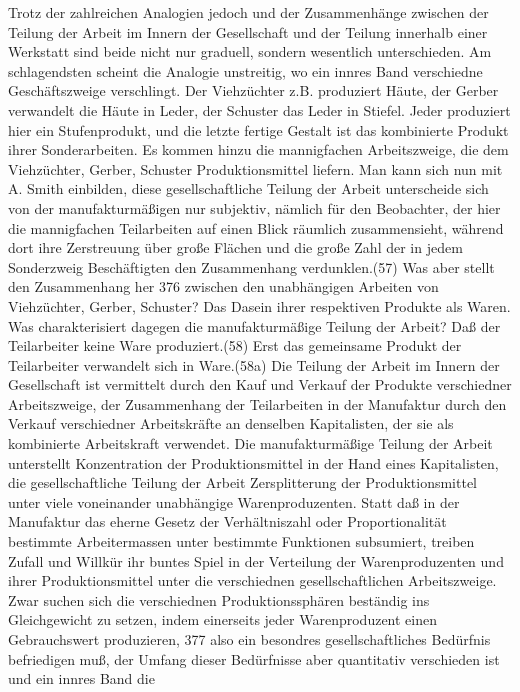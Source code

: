 {Trotz der zahlreichen Analogien jedoch und der Zusammenhänge zwischen
der Teilung der Arbeit im Innern der Gesellschaft und der Teilung
innerhalb einer Werkstatt sind beide nicht nur graduell, sondern
wesentlich unterschieden. Am schlagendsten scheint die Analogie
unstreitig, wo ein innres Band verschiedne Geschäftszweige verschlingt.
Der Viehzüchter z.B. produziert Häute, der Gerber verwandelt die Häute
in Leder, der Schuster das Leder in Stiefel. Jeder produziert hier ein
Stufenprodukt, und die letzte fertige Gestalt ist das kombinierte
Produkt ihrer Sonderarbeiten. Es kommen hinzu die mannigfachen
Arbeitszweige, die dem Viehzüchter, Gerber, Schuster Produktionsmittel
liefern. Man kann sich nun mit A. Smith einbilden, diese
gesellschaftliche Teilung der Arbeit unterscheide sich von der
manufakturmäßigen nur subjektiv, nämlich für den Beobachter, der hier
die mannigfachen Teilarbeiten auf einen Blick räumlich zusammensieht,
während dort ihre Zerstreuung über große Flächen und die große Zahl der
in jedem Sonderzweig Beschäftigten den Zusammenhang verdunklen.(57) Was
aber stellt den Zusammenhang her \num{376} zwischen
den unabhängigen Arbeiten von Viehzüchter, Gerber, Schuster? Das Dasein
ihrer respektiven Produkte als Waren. Was charakterisiert dagegen die
manufakturmäßige Teilung der Arbeit? Daß der Teilarbeiter keine Ware
produziert.(58) Erst das gemeinsame Produkt der Teilarbeiter verwandelt
sich in Ware.(58a) Die Teilung der Arbeit im Innern der Gesellschaft ist
vermittelt durch den Kauf und Verkauf der Produkte verschiedner
Arbeitszweige, der Zusammenhang der Teilarbeiten in der Manufaktur durch
den Verkauf verschiedner Arbeitskräfte an denselben Kapitalisten, der
sie als kombinierte Arbeitskraft verwendet. Die manufakturmäßige Teilung
der Arbeit unterstellt Konzentration der Produktionsmittel in der Hand
eines Kapitalisten, die gesellschaftliche Teilung der Arbeit
Zersplitterung der Produktionsmittel unter viele voneinander unabhängige
Warenproduzenten. Statt daß in der Manufaktur das eherne Gesetz der
Verhältniszahl oder Proportionalität bestimmte Arbeitermassen unter
bestimmte Funktionen subsumiert, treiben Zufall und Willkür ihr buntes
Spiel in der Verteilung der Warenproduzenten und ihrer Produktionsmittel
unter die verschiednen gesellschaftlichen Arbeitszweige. Zwar suchen
sich die verschiednen Produktionssphären beständig ins Gleichgewicht zu
setzen, indem einerseits jeder Warenproduzent einen Gebrauchswert
produzieren, \num{377} also ein besondres
gesellschaftliches Bedürfnis befriedigen muß, der Umfang dieser
Bedürfnisse aber quantitativ verschieden ist und ein innres Band die
}

